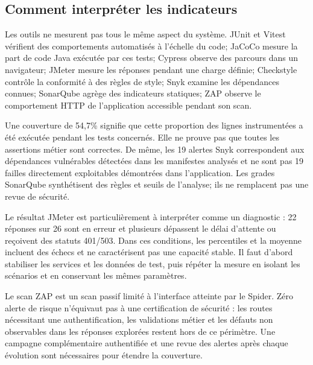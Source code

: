 \documentclass[11pt,a4paper]{report}
\begin{document}
\subsection{Comment interpréter les indicateurs}
Les outils ne mesurent pas tous le même aspect du système. JUnit et Vitest vérifient des comportements automatisés à l'échelle du code; JaCoCo mesure la part de code Java exécutée par ces tests; Cypress observe des parcours dans un navigateur; JMeter mesure les réponses pendant une charge définie; Checkstyle contrôle la conformité à des règles de style; Snyk examine les dépendances connues; SonarQube agrège des indicateurs statiques; ZAP observe le comportement HTTP de l'application accessible pendant son scan.

Une couverture de 54,7\% signifie que cette proportion des lignes instrumentées a été exécutée pendant les tests concernés. Elle ne prouve pas que toutes les assertions métier sont correctes. De même, les 19 alertes Snyk correspondent aux dépendances vulnérables détectées dans les manifestes analysés et ne sont pas 19 failles directement exploitables démontrées dans l'application. Les grades SonarQube synthétisent des règles et seuils de l'analyse; ils ne remplacent pas une revue de sécurité.

Le résultat JMeter est particulièrement à interpréter comme un diagnostic : 22 réponses sur 26 sont en erreur et plusieurs dépassent le délai d'attente ou reçoivent des statuts 401/503. Dans ces conditions, les percentiles et la moyenne incluent des échecs et ne caractérisent pas une capacité stable. Il faut d'abord stabiliser les services et les données de test, puis répéter la mesure en isolant les scénarios et en conservant les mêmes paramètres.

Le scan ZAP est un scan passif limité à l'interface atteinte par le Spider. Zéro alerte de risque n'équivaut pas à une certification de sécurité : les routes nécessitant une authentification, les validations métier et les défauts non observables dans les réponses explorées restent hors de ce périmètre. Une campagne complémentaire authentifiée et une revue des alertes après chaque évolution sont nécessaires pour étendre la couverture.
\end{document}
